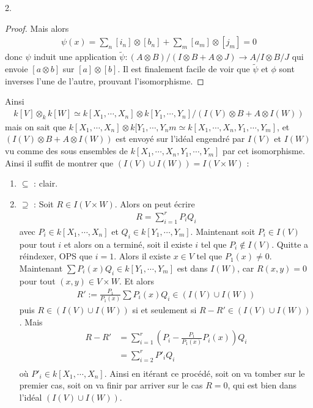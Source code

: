 \begin{question}{2.}
\begin{proof}
                Mais alors
                \begin{align*}
                    \psi(x) = \sum_n [i_n] \otimes [b_n] + \sum_m [a_m] \otimes [j_m] = 0
                \end{align*}
                donc $\psi$ induit une application $\tilde \psi : (A \otimes B)/(I \otimes B + A \otimes J) \to A/I \otimes B/J$ qui envoie $[a \otimes b]$ sur $[a] \otimes [b]$. Il est finalement facile de voir que $\tilde \psi$ et $\phi$ sont inverses l'une de l'autre, prouvant l'isomorphisme.
            \end{proof}
            Ainsi 
            \begin{align*}
                k[V] \otimes_k k[W] \simeq k[X_1, \cdots, X_n] \otimes k[Y_1, \cdots, Y_n] / (I(V) \otimes B + A \otimes I(W))
            \end{align*}
            mais on sait que $k[X_1, \cdots, X_n] \otimes k[Y_1, \cdots, Y_nm \simeq k[X_1, \cdots, X_n, Y_1, \cdots, Y_m]$, et $(I(V) \otimes B + A \otimes I(W))$ est envoyé sur l'idéal engendré par $I(V)$ et $I(W)$ vu comme des sous ensembles de $k[X_1, \cdots, X_n, Y_1, \cdots, Y_m]$ par cet isomorphisme. Ainsi il suffit de montrer que $(I(V) \cup I(W)) = I(V \times W)$ :
            \begin{enumerate}
                \item $\subseteq$ : clair.
                \item $\supseteq$ : Soit $R \in I(V \times W)$. Alors on peut écrire
                \begin{align*}
                    R = \sum_{i = 1}^r P_iQ_i
                \end{align*}
                avec $P_i \in k[X_1, \cdots, X_n]$ et $Q_i \in k[Y_1, \cdots, Y_m]$. Maintenant soit $P_i \in I(V)$ pour tout $i$ et alors on a terminé, soit il existe $i$ tel que $P_i \notin I(V)$. Quitte a réindexer, OPS que $i = 1$. Alors il existe $x \in V$ tel que $P_1(x) \neq 0$. Maintenant $\sum P_i(x) Q_i \in k[Y_1, \cdots, Y_m]$ est dans $I(W)$, car $R(x,y) = 0$ pour tout $(x,y) \in V \times W$. Et alors
                \begin{align*}
                    R' := \frac{P_1}{P_1(x)} \sum P_i(x) Q_i \in (I(V) \cup I(W))
                \end{align*}
                puis $R \in (I(V) \cup I(W))$ si et seulement si $R - R' \in (I(V) \cup I(W))$. Mais
                \begin{align*}
                    R - R' &= \sum_{i = 1}^r \left(P_i - \frac{P_1}{P_1(x)}P_i(x) \right) Q_i \\
                    &= \sum_{i = 2}^r P'_iQ_i \\
                \end{align*}
                où $P'_i \in k[X_1, \cdots, X_n]$. Ainsi en itérant ce procédé, soit on va tomber sur le premier cas, soit on va finir par arriver sur le cas $R = 0$, qui est bien dans l'idéal $(I(V) \cup I(W))$.
            \end{enumerate}
        \end{question}
